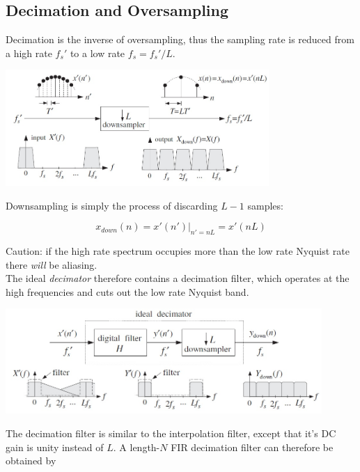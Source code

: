 \subsection{Decimation and Oversampling}
Decimation is the inverse of oversampling, thus the sampling rate is reduced
from a high rate $f_s'$ to a low rate $f_s = f_s' / L$.

\begin{center}
	\includegraphics[width=10cm]{images/IntDecOv_Downsampler.jpg}
\end{center}

Downsampling is simply the process of discarding $L-1$ samples:

\begin{equation*}
	x_{down}(n) = \left.x'(n')\right|_{n'=nL} = x'(nL)
\end{equation*}

Caution: if the high rate spectrum occupies more than the low rate Nyquist rate
there \emph{will} be aliasing. \\

The ideal \emph{decimator} therefore contains a decimation filter, which
operates at the high frequencies and cuts out the low rate Nyquist band.

\begin{center}
	\includegraphics[width=12cm]{images/IntDecOv_Decimator.jpg}
\end{center}

The decimation filter is similar to the interpolation filter, except that
it's DC gain is unity instead of $L$. A length-$N$ FIR decimation filter
can therefore be obtained by

